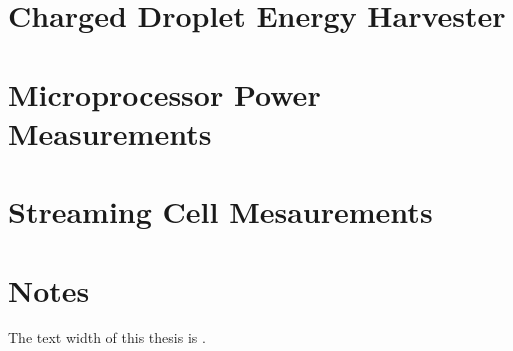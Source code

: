   \chapter{Charged Droplet Energy Harvester}
    
  \chapter{Microprocessor Power Measurements}
    
  \chapter{Streaming Cell Mesaurements}
    

\chapter*{Notes}
The text width of this thesis is \the\textwidth.






